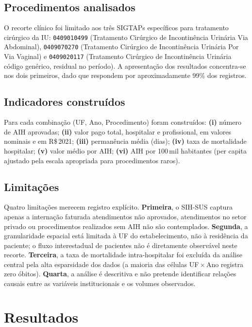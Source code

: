 \documentclass[12pt,a4paper,oneside]{article}
\newcommand{\rs}{R\$\,}
\begin{document}
\subsection{Procedimentos analisados}

O recorte clínico foi limitado aos três SIGTAPs específicos para
tratamento cirúrgico da IU: \texttt{0409010499} (Tratamento Cirúrgico
de Incontinência Urinária Via Abdominal), \texttt{0409070270}
(Tratamento Cirúrgico de Incontinência Urinária Por Via Vaginal) e
\texttt{0409020117} (Tratamento Cirúrgico de Incontinência Urinária
\textemdash{} código genérico, residual no período). A apresentação
dos resultados concentra-se nos dois primeiros, dado que respondem
por aproximadamente 99\% dos registros.

\subsection{Indicadores construídos}

Para cada combinação (UF, Ano, Procedimento) foram construídos:
\textbf{(i)} número de AIH aprovadas; \textbf{(ii)} valor pago total,
hospitalar e profissional, em valores nominais e em \rs 2021;
\textbf{(iii)} permanência média (dias); \textbf{(iv)} taxa de
mortalidade hospitalar; \textbf{(v)} valor médio por AIH; \textbf{(vi)}
AIH por 100\,mil habitantes (per capita ajustado pela escala
apropriada para procedimentos raros).

\subsection{Limitações}

Quatro limitações merecem registro explícito. \textbf{Primeira}, o
SIH-SUS captura apenas a internação faturada \textemdash{} atendimentos
não aprovados, atendimentos no setor privado ou procedimentos
realizados sem AIH não são contemplados. \textbf{Segunda}, a
granularidade espacial está limitada à UF do estabelecimento, não à
residência da paciente; o fluxo interestadual de pacientes não é
diretamente observável neste recorte. \textbf{Terceira}, a taxa de
mortalidade intra-hospitalar foi excluída da análise central pela
alta esparsidade dos dados (a maioria das células UF\,$\times$\,Ano
registra zero óbitos). \textbf{Quarta}, a análise é descritiva e não
pretende identificar relações causais entre as variáveis institucionais
e os volumes observados.

\section{Resultados}\label{sec:resultados}
\end{document}
